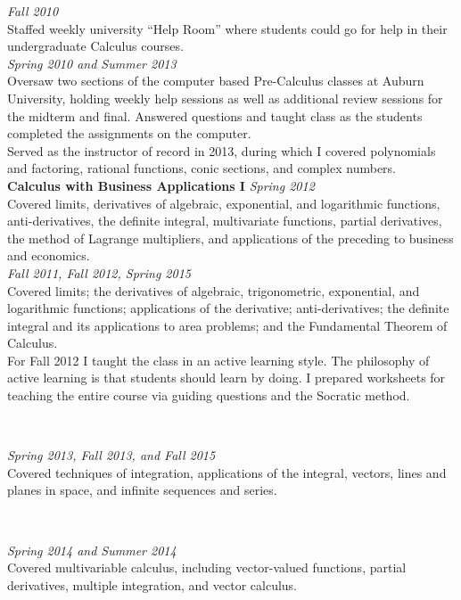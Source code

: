 \documentclass{article}
\begin{document}
 \hfill {\it Fall 2010\/} \\
Staffed weekly university ``Help Room'' where students could go for help in
their undergraduate Calculus courses. \\ 

 \hfill {\it Spring 2010 and Summer 2013} \\
Oversaw two sections of the computer based Pre-Calculus classes at Auburn
University, holding weekly help sessions as well as additional review sessions
for the midterm and final.  Answered questions and taught class as the
students completed the assignments on the computer. \\
Served as the instructor of record in 2013, during which I covered polynomials
and factoring, rational functions, conic sections, and complex numbers.
\\

\noindent\textbf{Calculus with Business Applications I} \hfill \textit{Spring 2012}\\
Covered limits, derivatives of algebraic, exponential, and logarithmic
functions, anti-derivatives, the definite integral, multivariate functions,
partial derivatives, the method of Lagrange multipliers, and applications of the
preceding to business and economics.
\\

 \hfill {\it Fall 2011, Fall 2012, Spring 2015}\\
Covered limits; the derivatives of algebraic, trigonometric, exponential, and
logarithmic functions; applications of the derivative; anti-derivatives; the
definite integral and its applications to area problems; and the Fundamental
Theorem of Calculus. \\ For Fall 2012 I taught the class in an active learning
style. The philosophy of active learning is that students should learn by
doing. I prepared worksheets for teaching the entire course via guiding
questions and the Socratic method.

\

 \hfill {\it Spring 2013, Fall 2013, and Fall 2015}\\
Covered techniques of integration, applications of the
integral, vectors, lines and planes in space, and infinite sequences
and series.  

\

 \hfill {\it Spring 2014 and Summer 2014}\\
Covered multivariable calculus, including vector-valued
functions, partial derivatives, multiple integration, and vector
calculus. 
\end{document}
